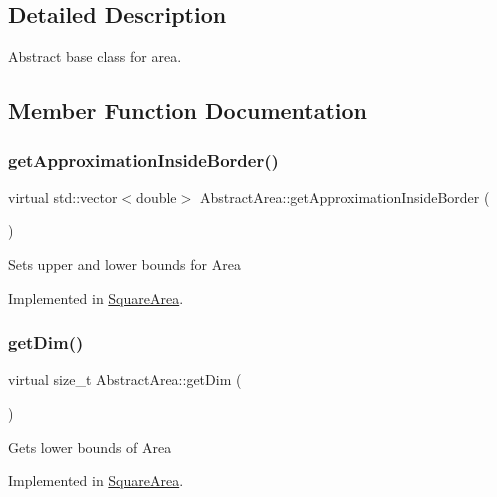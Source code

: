 \subsection{Detailed Description}
Abstract base class for area. 

\subsection{Member Function Documentation}
\mbox{\label{class_abstract_area_a832003b7c0e9e75d417c577b56a3013a}} 
\subsubsection{\texorpdfstring{get\+Approximation\+Inside\+Border()}{getApproximationInsideBorder()}}
{\footnotesize\ttfamily virtual std\+::vector$<$double$>$ Abstract\+Area\+::get\+Approximation\+Inside\+Border (\begin{DoxyParamCaption}{ }\end{DoxyParamCaption})\hspace{0.3cm}{\ttfamily [pure virtual]}}

Sets upper and lower bounds for Area 

Implemented in \hyperlink{class_square_area_abd7441aaf62dcbf46a22e2d6a5ef34d4}{Square\+Area}.

\mbox{\label{class_abstract_area_af7e07218e25ae2864d82d829ff1c10b9}} 
\subsubsection{\texorpdfstring{get\+Dim()}{getDim()}}
{\footnotesize\ttfamily virtual size\+\_\+t Abstract\+Area\+::get\+Dim (\begin{DoxyParamCaption}{ }\end{DoxyParamCaption})\hspace{0.3cm}{\ttfamily [pure virtual]}}

Gets lower bounds of Area 

Implemented in \hyperlink{class_square_area_a4c0aafc649029e04aeffbb69d70311c5}{Square\+Area}.

